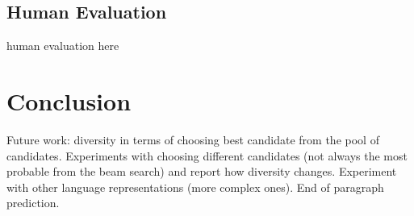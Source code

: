 \documentclass[11pt,a4paper]{article}
\begin{document}

\subsection{Human Evaluation}
human evaluation here

\section{Conclusion}
Future work: diversity in terms of choosing best candidate from the pool of candidates.
Experiments with choosing different candidates (not always the most probable from the beam search) and report how diversity changes.
Experiment with other language representations (more complex ones).
End of paragraph prediction.

\end{document}
